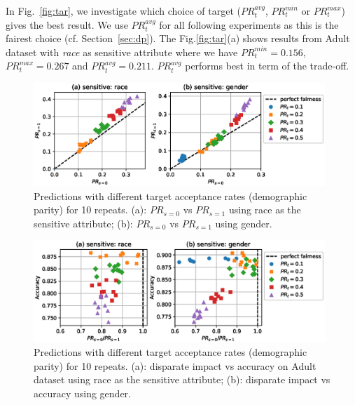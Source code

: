In Fig.~\ref{fig:tar}, we investigate which choice of target ($\mathit{PR}_t^{avg}$, $\mathit{PR}_t^{min}$ or $\mathit{PR}_t^{max}$)
gives the best result.
We use $\mathit{PR}_t^{avg}$ for all following experiments as this is the fairest choice (cf. Section~\ref{sec:dp}).
The Fig.\ref{fig:tar}(a) shows results from Adult dataset with \emph{race} as sensitive attribute
where we have $\mathit{PR}_t^{min}=0.156$, $\mathit{PR}_t^{max}=0.267$ and $\mathit{PR}_t^{avg} =0.211$.
$\mathit{PR}_t^{avg}$ performs best in term of the trade-off.%
\begin{figure}[t]
  \centering
  \includegraphics[width=0.98\textwidth]{./figures/adult_parity_scatter_pr_pr.eps}
  \caption{
    Predictions with different target acceptance rates (demographic parity) for 10 repeats.
    (a): $\mathit{PR}_{s=0}$ vs $\mathit{PR}_{s=1}$ using race as the sensitive attribute;
    (b): $\mathit{PR}_{s=0}$ vs $\mathit{PR}_{s=1}$ using gender.
  }%
  \label{fig:adult_parity_scatter_pr_pr}
\end{figure}%
\begin{figure}[t]
  \centering
  \includegraphics[width=0.98\textwidth]{./figures/adult_parity_scatter_acc.eps}
  \caption{
    Predictions with different target acceptance rates (demographic parity) for 10 repeats.
    (a): disparate impact vs accuracy on Adult dataset using race as the sensitive attribute;
    (b): disparate impact vs accuracy using gender.
  }%
  \label{fig:adult_parity_scatter_acc}
\end{figure}%

